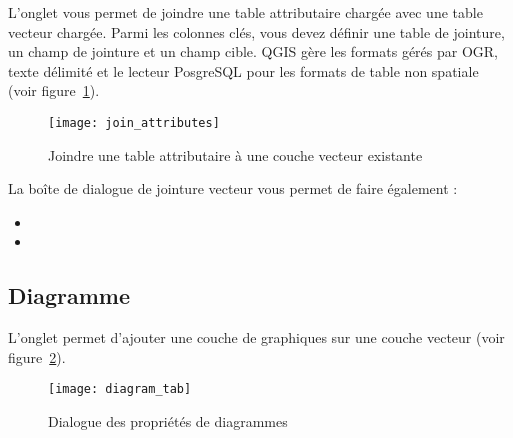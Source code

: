 L'onglet  vous permet de joindre une table attributaire chargée avec 
une table vecteur chargée. Parmi les colonnes clés, vous devez définir une table 
de jointure, un champ de jointure et un champ cible. QGIS gère les formats gérés 
par OGR, texte délimité et le lecteur PosgreSQL pour les formats de table non 
spatiale (voir figure~\ref{fig:join_attributes}).

\begin{figure}[ht]
   \centering
   \texttt{[image: join\_attributes]}
    \caption{Joindre une table attributaire à une couche vecteur existante \nixcaption}
   \label{fig:join_attributes}
\end{figure}

La boîte de dialogue de jointure vecteur vous permet de faire également :

\begin{itemize}[label=--]
\item {}
\item {}
\end{itemize}


\subsection{Diagramme}\label{sec:diagram}
L'onglet  permet d'ajouter une couche de graphiques sur une couche 
vecteur (voir figure~\ref{fig:diagramtab}).

\begin{figure}[ht]
   \begin{center}
   \texttt{[image: diagram\_tab]}
   \caption{Dialogue des propriétés de diagrammes \nixcaption}
   \label{fig:diagramtab}
\end{center}
\end{figure}

